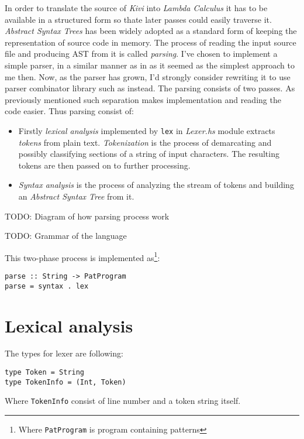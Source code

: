\documentclass[12pt,a4paper]{report}
\begin{document}
In order to translate the source of \textit{Kivi} into \textit{Lambda Calculus}
it has to be available in a structured form so thate later passes could easily
traverse it. \textit{Abstract Syntax Trees}\cite{wiki:ast} has been widely adopted as a
standard form of keeping the representation of source code in memory. The
process of reading the input source file and producing AST from it is called
\textit{parsing}.
I've chosen to implement a simple parser, in a similar manner as in
\cite{JonLes00} as it seemed as the simplest approach to me then. Now, as
the parser has grown, I'd strongly consider rewriting it to use parser combinator
library such as \cite{website:parsec} instead.  The parsing consists of two
passes. As previously mentioned such separation makes implementation and
reading the code easier. Thus parsing consist of:

\begin{itemize}
  \item Firstly \textit{lexical analysis} implemented by \texttt{lex} in
    \textit{Lexer.hs} module extracts \textit{tokens} from plain text.
    \textit{Tokenization} is the process of demarcating and possibly
    classifying sections of a string of input characters. The resulting tokens
    are then passed on to further processing.
  \item \textit{Syntax analysis} is the process of analyzing the stream of
    tokens and building an \textit{Abstract Syntax Tree} from it.
\end{itemize}


TODO: Diagram of how parsing process work

TODO: Grammar of the language

This two-phase process is implemented as\footnote{Where \texttt{PatProgram}
is program containing patterns}:

\hspace*{-1.5in}
\begin{lstlisting}
parse :: String -> PatProgram
parse = syntax . lex
\end{lstlisting}

\section{Lexical analysis}

The types for lexer are following:

\hspace*{-1.5in}
\begin{lstlisting}
type Token = String
type TokenInfo = (Int, Token)
\end{lstlisting}
Where \texttt{TokenInfo} consist of line number and a token string itself.
\end{document}
